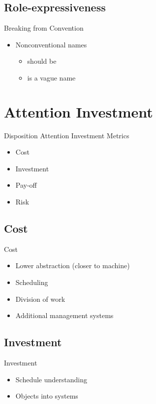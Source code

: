 \subsection{Role-expressiveness}
\begin{frame}{\secname}{\subsecname}
	Breaking from Convention
	\begin{itemize}
		\item<2-> Nonconventional names
		\begin{itemize}
			\item<3->  should be 
			\item<4->  is a vague name
		\end{itemize}
	\end{itemize}
\end{frame}

\section{Attention Investment}
\begin{frame}{\secname}{Disposition}
	Attention Investment Metrics
	\begin{itemize}
		\item Cost
		\item Investment
		\item Pay-off
		\item Risk
	\end{itemize}
\end{frame}

\subsection{Cost}
\begin{frame}{\secname}{\subsecname}
	Cost
	\begin{itemize}
		\item<2-> Lower abstraction (closer to machine)
		\item<3-> Scheduling
		\item<4-> Division of work
		\item<5-> Additional management systems
	\end{itemize}
\end{frame}

\subsection{Investment}
\begin{frame}{\secname}{\subsecname}
	Investment
	\begin{itemize}
		\item<2-> Schedule understanding
		\item<3-> Objects into systems
	\end{itemize}
\end{frame}

